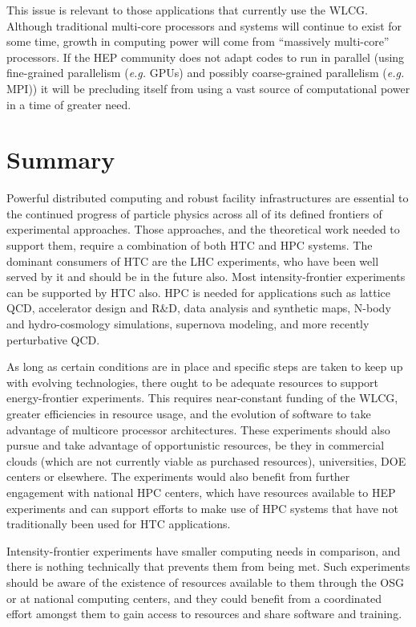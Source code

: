 This issue is relevant to those applications that currently use the WLCG. 
Although traditional multi-core processors and systems will continue to exist for some time, 
growth in computing power will come from “massively multi-core” processors. If the HEP community does not adapt codes 
to run in parallel (using fine-grained parallelism ({\it e.g.} GPUs) and possibly 
coarse-grained parallelism ({\it e.g.} MPI)) it will be precluding itself from using a vast source 
of computational power in a time of greater need.
 
\section{Summary}
\label{sec:comp-summary}
Powerful distributed computing and robust facility infrastructures are essential to the continued progress of particle physics across all of its defined frontiers of experimental approaches.  Those approaches, and the theoretical work needed to support them, require a combination of both HTC and HPC systems.  The dominant consumers of HTC are the LHC experiments, who have been well served by it and should be in the future also.  Most intensity-frontier experiments can be supported by HTC also.  HPC is needed for applications such as lattice QCD, accelerator design and R\&D, data analysis and synthetic maps, N-body and hydro-cosmology simulations, supernova modeling, and more recently perturbative QCD.

As long as certain conditions are in place and specific steps are taken to keep up with evolving technologies, there ought to be adequate resources to support energy-frontier experiments.  This requires near-constant funding of the WLCG, greater efficiencies in resource usage, and the evolution of software to take advantage of multicore processor architectures.  These experiments should also pursue and take advantage of opportunistic resources, be they in commercial clouds (which are not currently viable as purchased resources), universities, DOE centers or elsewhere.  The experiments would also benefit from further engagement with national HPC centers, which have resources available to HEP experiments and can support efforts to make use of HPC systems that have not traditionally been used for HTC applications.

Intensity-frontier experiments have smaller computing needs in comparison, and there is nothing technically that prevents them from being met.  Such experiments should be aware of the existence of resources available to them through the OSG or at national computing centers, and they could benefit from a coordinated effort amongst them to gain access to resources and share software and training.

